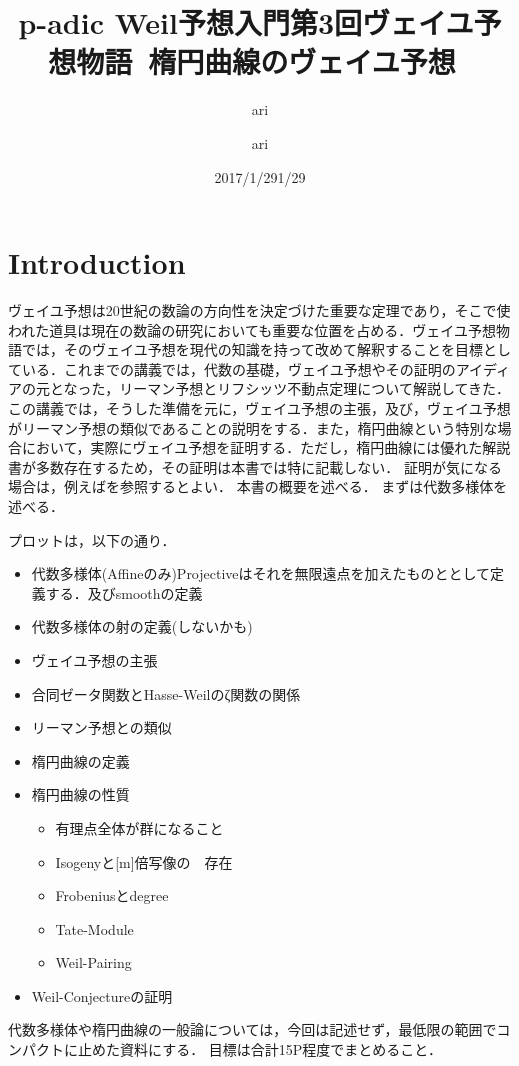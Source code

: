 \documentclass{ujarticle}
\author{ari}
\title{p-adic Weil予想入門}
\date{2017/1/29}
\title{第3回ヴェイユ予想物語~楕円曲線のヴェイユ予想~}
\author{ari}
\date{1/29}
\begin{document}
\maketitle
\tableofcontents

\section{Introduction}
\label{sec:Introduction}

ヴェイユ予想は20世紀の数論の方向性を決定づけた重要な定理であり，そこで使われた道具は現在の数論の研究においても重要な位置を占める．ヴェイユ予想物語では，そのヴェイユ予想を現代の知識を持って改めて解釈することを目標としている．これまでの講義では，代数の基礎，ヴェイユ予想やその証明のアイディアの元となった，リーマン予想とリフシッツ不動点定理について解説してきた．この講義では，そうした準備を元に，ヴェイユ予想の主張，及び，ヴェイユ予想がリーマン予想の類似であることの説明をする．また，楕円曲線という特別な場合において，実際にヴェイユ予想を証明する．ただし，楕円曲線には優れた解説書が多数存在するため，その証明は本書では特に記載しない．
証明が気になる場合は，例えば\cite{s}を参照するとよい．
本書の概要を述べる．
まずは代数多様体を述べる．

プロットは，以下の通り．

\begin{itemize}
  \item 代数多様体(Affineのみ)Projectiveはそれを無限遠点を加えたものととして定義する．及びsmoothの定義
  \item 代数多様体の射の定義(しないかも)
  \item ヴェイユ予想の主張
  \item 合同ゼータ関数とHasse-Weilのζ関数の関係
  \item リーマン予想との類似
  \item 楕円曲線の定義
  \item 楕円曲線の性質
  \begin{itemize}
    \item 有理点全体が群になること
    \item Isogenyと[m]倍写像の　存在
    \item Frobeniusとdegree
    \item Tate-Module
    \item Weil-Pairing
  \end{itemize}
  \item Weil-Conjectureの証明
\end{itemize}
代数多様体や楕円曲線の一般論については，今回は記述せず，最低限の範囲でコンパクトに止めた資料にする．
目標は合計15P程度でまとめること．
\end{document}
